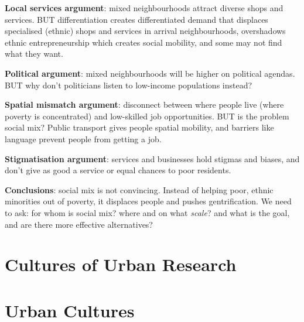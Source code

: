 \documentclass{article}
\newcommand{\alignedmarginpar}[1]{%
        \marginpar{\raggedright\small #1}
    }
\begin{document}
\textbf{Local services argument}: mixed neighbourhoods attract diverse shops and services. BUT differentiation creates differentiated demand that displaces specialised (ethnic) shops and services in arrival neighbourhoods, overshadows ethnic entrepreneurship which creates social mobility, and some may not find what they want.

\textbf{Political argument}:\alignedmarginpar{Environmental racism}mixed neighbourhoods will be higher on political agendas. BUT why don't politicians listen to low-income populations instead?

\textbf{Spatial mismatch argument}: disconnect between where people live (where poverty is concentrated) and low-skilled job opportunities. BUT is the problem social mix? Public transport gives people spatial mobility, and barriers like language prevent people from getting a job.

\textbf{Stigmatisation argument}: services and businesses hold stigmas and biases, and don't give as good a service or equal chances to poor residents.

\textbf{Conclusions}: social mix is not convincing. Instead of helping poor, ethnic minorities out of poverty, it displaces people and pushes gentrification. We need to ask: for whom is social mix? where and on what \textit{scale}? and what is the goal, and are there more effective alternatives? 

\pagebreak\section{Cultures of Urban Research}

\textbf{}

\textbf{}

\textbf{}

\textbf{}

\textbf{}

\textbf{}

\textbf{}

\textbf{}

\textbf{}

\pagebreak\section{Urban Cultures}

\textbf{}

\textbf{}

\textbf{}

\textbf{}
\end{document}
